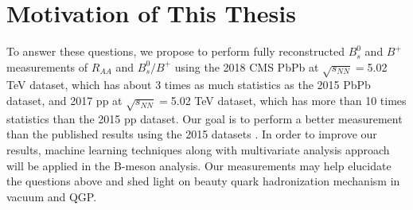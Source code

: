 




\section{Motivation of This Thesis}

To answer these questions, we propose to perform fully reconstructed $B^0_s$ and $B^+$ measurements of $R_{AA}$ and $B^0_s/B^+$ using the 2018 CMS PbPb at $\sqrt{s_{NN}} = $5.02 TeV dataset, which has about 3 times as much statistics as the 2015 PbPb dataset, and 2017 pp at $\sqrt{s_{NN}} = $5.02 TeV dataset, which has more than 10 times statistics than the 2015 pp dataset. Our goal is to perform a better measurement than the published results using the 2015 datasets \cite{CMSBsBP2015}. In order to improve our results, machine learning techniques along with multivariate analysis approach will be applied in the B-meson analysis. Our measurements may help elucidate the questions above and shed light on beauty quark hadronization mechanism in vacuum and QGP. 


